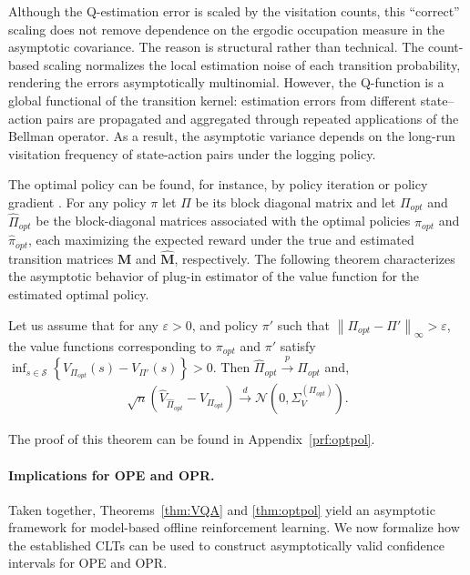 \documentclass[twoside,11pt]{article}
\newcommand{\pow}[1]{^{(#1)}}%
\numberwithin{equation}{section}
\newcommand{\lp}{\left(}
\newcommand{\rp}{\right)}
\newcommand{\lc}{\left\{}
\newcommand{\rc}{\right\}}
\newcommand{\lV}{\left\|}
\newcommand{\rV}{\right\|}
\newcommand{\Ncal}{\mathcal{N}}
\newcommand{\eps}{\varepsilon}
\begin{document}
Although the Q-estimation error is scaled by the visitation counts, this ``correct'' scaling does
not remove dependence on the ergodic occupation measure in the asymptotic covariance.
The reason is structural rather than technical.
The count-based scaling normalizes the local estimation noise of each transition probability,
rendering the errors asymptotically multinomial.
However, the Q-function is a global functional of the transition kernel: estimation errors
from different state–action pairs are propagated and aggregated through repeated
applications of the Bellman operator.
As a result, the asymptotic variance depends on the long-run visitation frequency of
state-action pairs under the logging policy.


The optimal policy can be found, for instance, by policy iteration \citep[Chapter 1]{bertsekas2011dynamic} or policy gradient \citep[Chapter 13]{sutton2018reinforcement}. 
For any policy $\pi$ let $\Pi$ be its block diagonal matrix and let $\Pi_{opt}$ and $\hat \Pi_{opt}$ be the block-diagonal matrices associated with the optimal policies $\pi_{opt}$ and $\hat \pi_{opt}$, each maximizing the expected reward under the true and estimated transition matrices $\mathbf{M}$ and $\mathbf{\hat M}$, respectively. 
The following theorem characterizes the asymptotic behavior of plug-in estimator of the value function  for the estimated optimal policy.
\begin{theorem}\label{thm:optpol}
    Let us assume that for any $\eps>0$, and policy $\pi'$ such that $\lV \Pi_{opt}-\Pi'\rV_{\infty}>\eps$, the value functions corresponding to $\pi_{opt}$ and $\pi'$ satisfy  
    $\inf_{s\in \mathcal{S}}\lc V_{\Pi_{opt}}(s)-V_{\Pi'}(s)\rc>0$. 
    Then $\hat \Pi_{opt}\overset{p}{\rightarrow}\Pi_{opt}$ and,
    \begin{align*}
         \sqrt{n}\lp\hat V_{\hat \Pi_{opt}}-V_{\Pi_{opt}}\rp \overset{d}{\rightarrow} \Ncal\lp0,\Sigma_V\pow{\Pi_{opt}}\rp.
    \end{align*}
\end{theorem}
The proof of this theorem can be found in Appendix~\ref{prf:optpol}.

\paragraph{Implications for OPE and OPR.}
Taken together, Theorems~\ref{thm:VQA} and \ref{thm:optpol} yield an asymptotic
framework for model-based offline reinforcement learning.
We now formalize how the established CLTs can be used to construct asymptotically valid confidence intervals for OPE and OPR.
\end{document}
